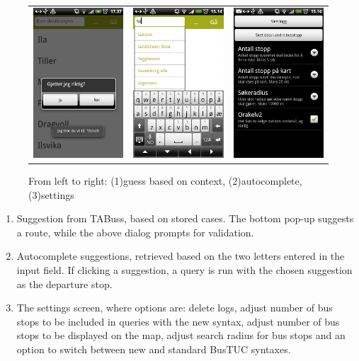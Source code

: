 \begin{figure}[!h]
\begin{tabular}{ccc}
\includegraphics[width=0.27\linewidth]{Results/contextaware.png} & 
\includegraphics[width=0.27\linewidth]{Results/autocomplete.png} &
\includegraphics[width=0.27\linewidth]{Results/settings.png}\\
\end{tabular}
\caption{From left to right: (1)guess based on context, (2)autocomplete, (3)settings}
\end{figure}
\begin{enumerate}
\item{Suggestion from TABuss, based on stored cases. The bottom pop-up suggests a route, while the above dialog prompts for validation.}
\item{Autocomplete suggestions, retrieved based on the two letters entered in the input field. If clicking a suggestion, a query is run with the chosen suggestion as the departure stop.}
\item{The settings screen, where options are: delete logs, adjust number of bus stops to be included in queries with the new syntax, adjust number of bus stops to be displayed on the map, adjust search radius for bus stops and an option to switch between new and standard BusTUC syntaxes.}
\end{enumerate}


